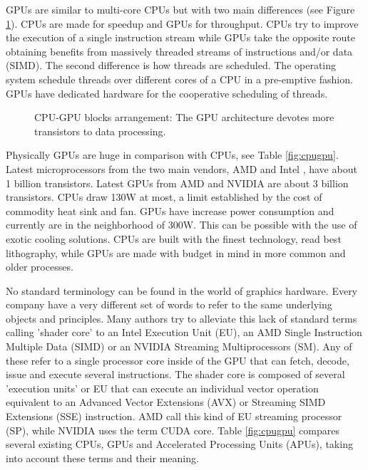 \documentclass[prodmode,acmtecs]{acmsmall}
\begin{document}
GPUs are similar to multi-core CPUs but with two main differences (see Figure \ref{figure:captura2paperCEC}). CPUs are made for speedup and GPUs for throughput. CPUs try to improve the execution of a single instruction stream while GPUs take the opposite route obtaining benefits from massively threaded streams of instructions and/or data (SIMD). The second difference is how threads are scheduled. The operating system schedule threads over different cores of a CPU in a pre-emptive fashion. GPUs have dedicated hardware for the cooperative scheduling of threads.

\begin{figure}[h]
\centerline{}
\caption{CPU-GPU blocks arrangement: The GPU architecture devotes more transistors to data processing.}
\label{figure:captura2paperCEC}
\end{figure}

Physically GPUs are huge in comparison with CPUs, see Table \ref{fig:cpugpu}. Latest microprocessors from the two main vendors, AMD \cite{amd} and Intel \cite{intel}, have about 1 billion transistors. Latest GPUs from AMD and NVIDIA \cite{nvidia} are about 3 billion transistors. CPUs draw 130W at most, a limit established by the cost of commodity heat sink and fan. GPUs have increase power consumption and currently are in the neighborhood of 300W. This can be possible with the use of exotic cooling solutions. CPUs are built with the finest technology, read best lithography, while GPUs are made with budget in mind in more common and older processes.

No standard terminology can be found in the world of graphics hardware.
Every company have a very different set of words to refer to the same underlying objects and principles. Many authors try to alleviate this lack of standard terms calling 'shader core' to an Intel Execution Unit (EU), an AMD Single Instruction Multiple Data (SIMD) or an NVIDIA Streaming Multiprocessors (SM). Any of these refer to a single processor core inside of the GPU that can fetch, decode, issue and execute several instructions. The shader core is composed of several 'execution units' or EU that can execute an individual vector operation equivalent to an Advanced Vector Extensions (AVX) or Streaming SIMD Extensions (SSE) instruction. AMD call this kind of EU streaming processor (SP), while NVIDIA uses the term CUDA core. Table \ref{fig:cpugpu} compares several existing CPUs, GPUs and Accelerated Processing Units (APUs), taking into account these terms and their meaning.
\end{document}
